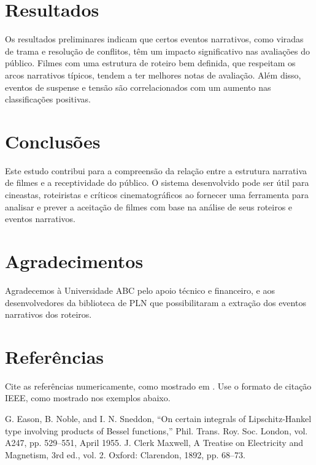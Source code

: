 \documentclass[conference]{IEEEtran}
\begin{document}
\section{Resultados}
Os resultados preliminares indicam que certos eventos narrativos, como viradas de trama e resolução de conflitos, têm um impacto significativo nas avaliações do público. Filmes com uma estrutura de roteiro bem definida, que respeitam os arcos narrativos típicos, tendem a ter melhores notas de avaliação. Além disso, eventos de suspense e tensão são correlacionados com um aumento nas classificações positivas.

\section{Conclusões}
Este estudo contribui para a compreensão da relação entre a estrutura narrativa de filmes e a receptividade do público. O sistema desenvolvido pode ser útil para cineastas, roteiristas e críticos cinematográficos ao fornecer uma ferramenta para analisar e prever a aceitação de filmes com base na análise de seus roteiros e eventos narrativos.

\section*{Agradecimentos}
Agradecemos à Universidade ABC pelo apoio técnico e financeiro, e aos desenvolvedores da biblioteca de PLN que possibilitaram a extração dos eventos narrativos dos roteiros.

\section*{Referências}
Cite as referências numericamente, como mostrado em \cite{b1}. Use o formato de citação IEEE, como mostrado nos exemplos abaixo.

\begin{thebibliography}{00}
 G. Eason, B. Noble, and I. N. Sneddon, ``On certain integrals of Lipschitz-Hankel type involving products of Bessel functions,'' Phil. Trans. Roy. Soc. London, vol. A247, pp. 529--551, April 1955.
 J. Clerk Maxwell, A Treatise on Electricity and Magnetism, 3rd ed., vol. 2. Oxford: Clarendon, 1892, pp. 68--73.
\end{thebibliography}
\end{document}
